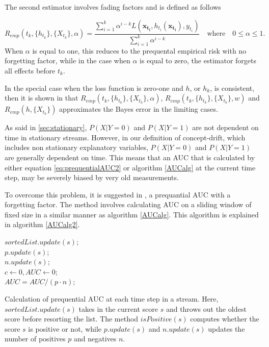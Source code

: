 The second estimator involves fading factors and is defined as follows

\begin{equation}
\label{eq:prequentialRisk3}
R_{emp}(t_k, \{h_{t_k}\}, \{X_{t_k}\}, \alpha) =\frac{\sum_{i=1}^k \alpha^{i-k}L(\bm{x_{t_i}} , h_{t_i}(\bm{x_{t_i}} ), y_{t_i})}{\sum_{i=1}^k \alpha^{i-k}} \quad \mbox{where} \quad 0 \leq \alpha \leq 1.
\end{equation}
When $\alpha$ is equal to one, this reduces to the prequental empirical risk with no forgetting factor, while in the case when $\alpha$ is equal to zero, the estimator forgets all effects before $t_k$.

In the special case when the loss function is zero-one and $h$, or $h_k$, is consistent, then it is shown in \cite{Gam13} that 
$R_{emp}(t_k, \{h_{t_k}\}, \{X_{t_k}\}, \alpha)$, $R_{emp}(t_k, \{h_{t_k}\}, \{X_{t_k}\}, w) $ and $R_{emp}(h, \{X_{t_k}\})$ approximates the Bayes error in the limiting cases.

As said in \ref{sec:stationary}, $P(X | Y = 0)$ and $P(X | Y = 1)$ are not dependent on time in stationary streams. However, in our definition of concept-drift, which includes non stationary explanatory variables, $P(X | Y = 0)$ and $P(X | Y = 1)$ are generally dependent on time.  This means that an AUC that is calculated by either equation \eqref{eq:prequentialAUC2} or algorithm \ref{AUCalg} at the current time step, may be severely biased by very old measurements.

To overcome this problem, it is suggested in \cite{Brz14}, a prequantial AUC with a forgetting factor.  The method involves calculating AUC on a sliding window of fixed size in a similar manner as algorithm \ref{AUCalg}.  This algorithm is explained in algorithm \ref{AUCalg2}.

\begin{algorithm}[H]
$sortedList.update(s)$;\\
$p.update(s)$;\\
$n.update(s)$;\\
$c \leftarrow 0, AUC \leftarrow 0$;\\
$ AUC = AUC/(p \cdot n)$;
\label{AUCalg2}
 \caption{Calculation of prequential AUC at each time step in a stream.  Here, $sortedList.update(s)$ takes in the current score $s$ and throws out the oldest score before resorting the list. The method $isPositive(s)$ computes whether the score $s$ is positive or not, while $p.update(s)$ and $n.update(s)$ updates the number of positives $p$ and negatives $n$.}
\end{algorithm}

